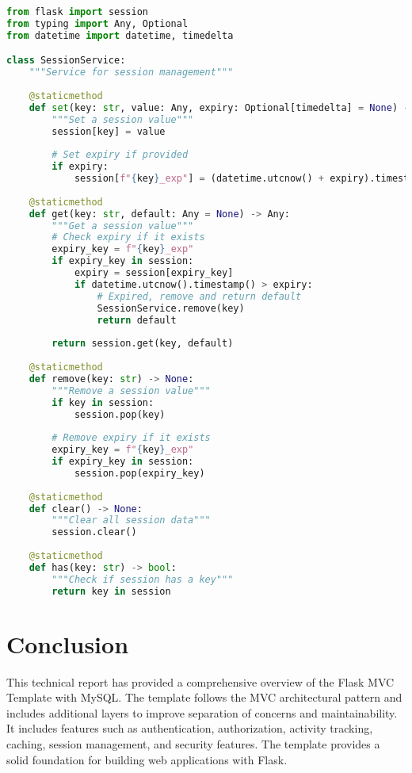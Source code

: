 \documentclass{article}
\begin{document}
\begin{lstlisting}[language=python, caption=Session Service in app/services/session\_service.py]
from flask import session
from typing import Any, Optional
from datetime import datetime, timedelta

class SessionService:
    """Service for session management"""
    
    @staticmethod
    def set(key: str, value: Any, expiry: Optional[timedelta] = None) -> None:
        """Set a session value"""
        session[key] = value
        
        # Set expiry if provided
        if expiry:
            session[f"{key}_exp"] = (datetime.utcnow() + expiry).timestamp()
    
    @staticmethod
    def get(key: str, default: Any = None) -> Any:
        """Get a session value"""
        # Check expiry if it exists
        expiry_key = f"{key}_exp"
        if expiry_key in session:
            expiry = session[expiry_key]
            if datetime.utcnow().timestamp() > expiry:
                # Expired, remove and return default
                SessionService.remove(key)
                return default
        
        return session.get(key, default)
    
    @staticmethod
    def remove(key: str) -> None:
        """Remove a session value"""
        if key in session:
            session.pop(key)
        
        # Remove expiry if it exists
        expiry_key = f"{key}_exp"
        if expiry_key in session:
            session.pop(expiry_key)
    
    @staticmethod
    def clear() -> None:
        """Clear all session data"""
        session.clear()
    
    @staticmethod
    def has(key: str) -> bool:
        """Check if session has a key"""
        return key in session
\end{lstlisting}

\section{Conclusion}

This technical report has provided a comprehensive overview of the Flask MVC Template with MySQL. The template follows the MVC architectural pattern and includes additional layers to improve separation of concerns and maintainability. It includes features such as authentication, authorization, activity tracking, caching, session management, and security features. The template provides a solid foundation for building web applications with Flask.
\end{document}
